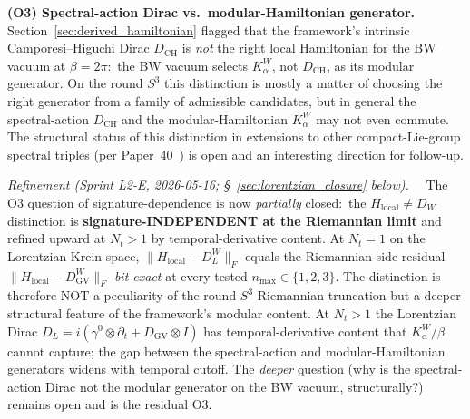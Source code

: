 \documentclass[11pt,a4paper]{article}
\theoremstyle{plain}
\theoremstyle{definition}
\newcommand{\sthree}{S^{3}}
\newcommand{\DCH}{D_{\mathrm{CH}}}
\begin{document}
\textbf{(O3) Spectral-action Dirac vs.\ modular-Hamiltonian generator.}
Section~\ref{sec:derived_hamiltonian} flagged that the framework's
intrinsic Camporesi--Higuchi Dirac $\DCH$ is \emph{not} the right
local Hamiltonian for the BW vacuum at $\beta = 2\pi$:\ the BW vacuum
selects $K_\alpha^W$, not $\DCH$, as its modular generator. On the
round $\sthree$ this distinction is mostly a matter of choosing the
right generator from a family of admissible candidates, but in
general the spectral-action $\DCH$ and the modular-Hamiltonian
$K_\alpha^W$ may not even commute. The structural status of this
distinction in extensions to other compact-Lie-group spectral triples
(per Paper~40~\cite{paper40_unified}) is open and an interesting
direction for follow-up.

\emph{Refinement (Sprint L2-E, 2026-05-16; \S~\ref{sec:lorentzian_closure} below).}\ \ %
The O3 question of signature-dependence is now \emph{partially}
closed:\ the $H_{\mathrm{local}} \ne D_W$ distinction is
\textbf{signature-INDEPENDENT at the Riemannian limit} and refined
upward at $N_t > 1$ by temporal-derivative content.  At $N_t = 1$
on the Lorentzian Krein space, $\|H_{\mathrm{local}} - D_L^W\|_F$
equals the Riemannian-side residual $\|H_{\mathrm{local}} - D_{\mathrm{GV}}^W\|_F$
\emph{bit-exact} at every tested $n_{\max} \in \{1, 2, 3\}$.  The
distinction is therefore NOT a peculiarity of the round-$\sthree$
Riemannian truncation but a deeper structural feature of the
framework's modular content.  At $N_t > 1$ the Lorentzian Dirac
$D_L = i(\gamma^0 \otimes \partial_t + D_{\mathrm{GV}} \otimes I)$
has temporal-derivative content that $K_\alpha^W / \beta$ cannot
capture; the gap between the spectral-action and modular-Hamiltonian
generators widens with temporal cutoff.  The \emph{deeper} question
(why is the spectral-action Dirac not the modular generator on the
BW vacuum, structurally?) remains open and is the residual O3.
\end{document}

